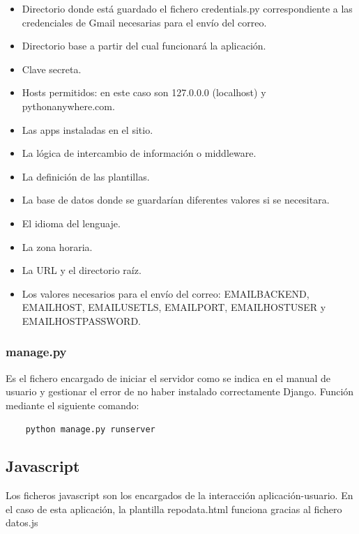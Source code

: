 \documentclass[a4paper, 12pt]{book}
\begin{document}
\begin{itemize}
	\item Directorio donde está guardado el fichero credentials.py correspondiente a las credenciales de Gmail necesarias para el envío del correo.
	\item Directorio base a partir del cual funcionará la aplicación.
	\item Clave secreta.
	\item Hosts permitidos: en este caso son 127.0.0.0 (localhost) y pythonanywhere.com.
	\item Las apps instaladas en el sitio.
	\item La lógica de intercambio de información o middleware\cite{website:middleware}.
	\item La definición de las plantillas.
	\item La base de datos donde se guardarían diferentes valores si se necesitara.
	\item El idioma del lenguaje.
	\item La zona horaria.
	\item La URL y el directorio raíz.
	\item Los valores necesarios para el envío del correo: EMAIL\textunderscore BACKEND, EMAIL\textunderscore HOST, EMAIL\textunderscore USE\textunderscore TLS, EMAIL\textunderscore PORT, EMAIL\textunderscore HOST\textunderscore USER y EMAIL\textunderscore HOST\textunderscore PASSWORD.
\end{itemize}

\subsubsection{manage.py}

Es el fichero encargado de iniciar el servidor como se indica en el manual de usuario y gestionar el error de no haber instalado correctamente Django. Función mediante el siguiente comando:

\begin{verbatim}
	python manage.py runserver
\end{verbatim}

\subsection{Javascript}

Los ficheros javascript son los encargados de la interacción aplicación-usuario. En el caso de esta aplicación, la plantilla repo\textunderscore data.html funciona gracias al fichero datos.js
\end{document}
